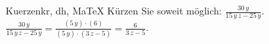 \begin{MAufgabe}{Kuerzen}{kr, dh, MaTeX}
K\"urzen Sie soweit m\"oglich: $\frac{30\, y}{15\, y\, z - 25\, y}$.\\ 
\ifLsg\MLoesung
\quad $\frac{30\, y}{15\, y\, z - 25\, y}=\frac{(5\, y)\cdot(6)}{(5\, y)\cdot(3\, z - 5)}=\frac{6}{3\, z - 5}$.\else\relax\fi
 \end{MAufgabe}